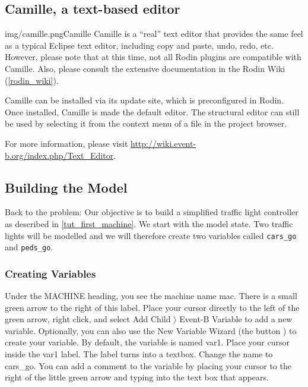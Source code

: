 \subsection{Camille, a text-based editor}
\label{tut_camille}

\begin{rodin-plugin}{img/camille.png}{Camille}
Camille is a ``real'' text editor that provides the same feel as a typical Eclipse text editor, including copy and paste, undo, redo, etc.  However, please note that at this time, not all Rodin plugins are compatible with Camille.  Also, please consult the extensive documentation in the Rodin Wiki (\ref{rodin_wiki}).

Camille can be installed via its update site, which is preconfigured in Rodin.  Once installed, Camille is made the default editor.  The structural editor can still be used by selecting it from the context menu of a file in the project browser.

For more information, please visit \url{http://wiki.event-b.org/index.php/Text_Editor}.


\end{rodin-plugin}

\subsection{Building the Model}
\label{tut_building_the_model}

Back to the problem: Our objective is to build a simplified traffic light controller as described in \ref{tut_first_machine}.  We start with the model state.  Two traffic lights will be modelled and we will therefore create two variables called  \texttt{cars\_go} and \texttt{peds\_go}.  

\subsubsection{Creating Variables}

Under the \textsf{MACHINE} heading, you see the machine name \textsf{mac}. There is a small green arrow to the right of this label. Place your cursor directly to the left of the green arrow, right click, and select \textsf{Add Child $\rangle$ Event-B Variable} to add a new variable. Optionally, you can also use the New Variable Wizard (the button ) to create your variable. By default, the variable is named \textsf{var1}. Place your cursor inside the \textsf{var1} label. The label turns into a textbox. Change the name to \textsf{cars\_go}. You can add a comment to the variable by placing your cursor to the right of the little green arrow and typing into the text box that appears.

